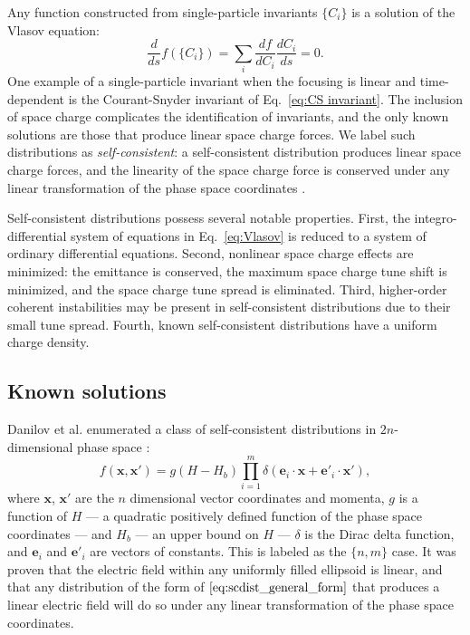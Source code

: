 Any function constructed from single-particle invariants $\{C_i\}$ is a solution of the Vlasov equation:
%
\begin{equation}\label{eq:vlasov_equilibria}
    \frac{d}{ds} f(\{C_i\}) = \sum_{i}{\frac{df}{dC_i}\frac{dC_i}{ds}} = 0.
\end{equation}
%
One example of a single-particle invariant when the focusing is linear and time-dependent is the Courant-Snyder invariant of Eq.~\eqref{eq:CS invariant}. The inclusion of space charge complicates the identification of invariants, and the only known solutions are those that produce linear space charge forces. We label such distributions as \textit{self-consistent}: a self-consistent distribution produces linear space charge forces, and the linearity of the space charge force is conserved under any linear transformation of the phase space coordinates \cite{Danilov2003}. 

Self-consistent distributions possess several notable properties. First, the integro-differential system of equations in Eq.~\eqref{eq:Vlasov} is reduced to a system of ordinary differential equations. Second, nonlinear space charge effects are minimized: the emittance is conserved, the maximum space charge tune shift is minimized, and the space charge tune spread is eliminated. Third, higher-order coherent instabilities may be present in self-consistent distributions due to their small tune spread. Fourth, known self-consistent distributions have a uniform charge density.



\subsection{Known solutions}

Danilov et al. enumerated a class of self-consistent distributions in $2n$-dimensional phase space \cite{Danilov2003}: 
%
\begin{equation}\label{eq:scdist_general_form}
    f\left({\mathbf{x}, \mathbf{x}'}\right) = 
    g\left({H - H_b}\right)
    \prod_{i=1}^{m}\delta\left({\mathbf{e}_i \cdot \mathbf{x} 
    + \mathbf{e}'_i \cdot \mathbf{x}'}\right),
\end{equation}
%
where $\mathbf{x}$, $\mathbf{x}'$ are the $n$ dimensional vector coordinates and momenta, $g$ is a function of $H$ — a quadratic positively defined function of the phase space coordinates — and $H_b$ — an upper bound on $H$ — $\delta$ is the Dirac delta function, and $\mathbf{e}_i$ and $\mathbf{e}'_i$ are vectors of constants. This is labeled as the $\{n,m\}$ case. It was proven that the electric field within any uniformly filled ellipsoid is linear, and that any distribution of the form of $\eqref{eq:scdist_general_form}$ that produces a linear electric field will do so under any linear transformation of the phase space coordinates.


